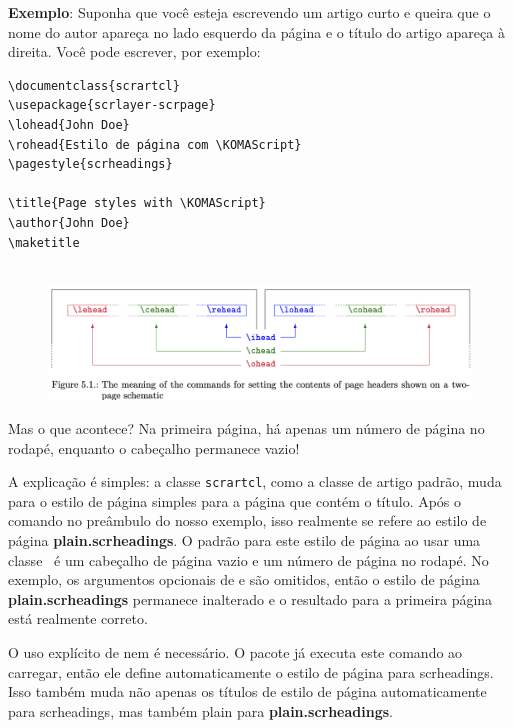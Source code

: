 \textbf{Exemplo}: Suponha que você esteja escrevendo um artigo curto e queira que o nome do autor apareça no lado esquerdo da página e o título do artigo apareça à direita. Você pode escrever, por exemplo:
\begin{small}
\begin{verbatim}
\documentclass{scrartcl}
\usepackage{scrlayer-scrpage}
\lohead{John Doe}
\rohead{Estilo de página com \KOMAScript}
\pagestyle{scrheadings}

\title{Page styles with \KOMAScript}
\author{John Doe}
\maketitle
  
\end{verbatim} 
\end{small}

\begin{figure}
    \centering
    \includegraphics[width=1\linewidth]{imagens/imagem04.png}
\end{figure}

Mas o que acontece? Na primeira página, há apenas um número de página no rodapé, enquanto o cabeçalho permanece vazio!

A explicação é simples: a classe \texttt{scrartcl}, como a classe de artigo padrão, muda para o estilo de página simples para a página que contém o título. Após o comando  no preâmbulo do nosso exemplo, isso realmente se refere ao estilo de página \textbf{plain.scrheadings}. O padrão para este estilo de página ao usar uma classe \KOMAScript\ é um cabeçalho de página vazio e um número de página no rodapé. No exemplo, os argumentos opcionais de  e  são omitidos, então o estilo de página \textbf{plain.scrheadings} permanece inalterado e o resultado para a primeira página está realmente correto.

O uso explícito de  nem é necessário. O pacote já executa este comando ao carregar, então ele define automaticamente o estilo de página para scrheadings. Isso também muda não apenas os títulos de estilo de página automaticamente para scrheadings, mas também plain para \textbf{plain.scrheadings}.

